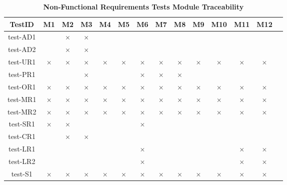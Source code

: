 \documentclass[12pt, titlepage]{article}
\begin{document}
\begin{table} [H]
  \centering
  \begin{tabular}{|c|c|c|c|c|c|c|c|c|c|c|c|c|c|}
    \hline
    TestID & M1 & M2 & M3 & M4 & M5 & M6 & M7 & M8 & M9 & M10 & M11 & M12 \\
    \hline
    test-AD1 & & $\times$ & $\times$ & & & & & & & & &\\
    \hline
    test-AD2 & & $\times$ & $\times$ & & & & & & & & &\\
    \hline
    test-UR1 & $\times$ & $\times$ & $\times$ & $\times$ & $\times$ & $\times$ & $\times$ & $\times$ & $\times$ & $\times$ & $\times$ & $\times$ \\
    \hline
    test-PR1 & & & $\times$ & & & $\times$ & $\times$ & $\times$ & & & &\\
    \hline
    test-OR1 & $\times$ & $\times$ & $\times$ & $\times$ & $\times$ & $\times$ & $\times$ & $\times$ & $\times$ & $\times$ & $\times$ & $\times$ \\
    \hline
    test-MR1 & $\times$ & $\times$ & $\times$ & $\times$ & $\times$ & $\times$ & $\times$ & $\times$ & $\times$ & $\times$ & $\times$ & $\times$ \\
    \hline
    test-MR2 & $\times$ & $\times$ & $\times$ & $\times$ & $\times$ & $\times$ & $\times$ & $\times$ & $\times$ & $\times$ & $\times$ & $\times$ \\
    \hline
    test-SR1 & $\times$ & $\times$ & & & & $\times$ & & & & & & \\
    \hline
    test-CR1 & & $\times$ & $\times$ & & & & & & & & & \\
    \hline
    test-LR1 & & & & & & $\times$ & & & & & $\times$ & $\times$\\
    \hline
    test-LR2 & & & & & & $\times$ & & & & & $\times$ & $\times$\\
    \hline
    test-S1 & $\times$ & $\times$ & $\times$ & $\times$ & $\times$ & $\times$ & $\times$ & $\times$ & $\times$ & $\times$ & $\times$ & $\times$ \\
    \hline
  \end{tabular}
\caption{\bf Non-Functional Requirements Tests Module Traceability} \label{tab:nfr-test-traceability}
\end{table}
\end{document}

